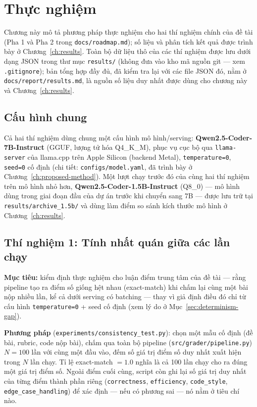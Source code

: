 \documentclass[a4paper,12pt]{report}
\begin{document}
\chapter{Thực nghiệm}
\label{ch:experiments}

Chương này mô tả phương pháp thực nghiệm cho hai thí nghiệm chính của đề
tài (Pha 1 và Pha 2 trong \texttt{docs/roadmap.md}); số liệu và phân tích
kết quả được trình bày ở Chương~\ref{ch:results}. Toàn bộ dữ liệu thô của
các thí nghiệm được lưu dưới dạng JSON trong thư mục \texttt{results/}
(không đưa vào kho mã nguồn git — xem \texttt{.gitignore}); bản tổng hợp
đầy đủ, đã kiểm tra lại với các file JSON đó, nằm ở
\texttt{docs/report/results.md}, là nguồn số liệu duy nhất được dùng cho
chương này và Chương~\ref{ch:results}.

\section{Cấu hình chung}

Cả hai thí nghiệm dùng chung một cấu hình mô hình/serving:
\textbf{Qwen2.5-Coder-7B-Instruct} (GGUF, lượng tử hóa Q4\_K\_M), phục vụ
cục bộ qua \texttt{llama-server} của llama.cpp trên Apple Silicon (backend
Metal), \texttt{temperature=0}, \texttt{seed=0} cố định (chi tiết:
\texttt{configs/model.yaml}, đã trình bày ở
Chương~\ref{ch:proposed-method}). Một lượt chạy trước đó của cùng hai thí
nghiệm trên mô hình nhỏ hơn, \textbf{Qwen2.5-Coder-1.5B-Instruct} (Q8\_0) —
mô hình dùng trong giai đoạn đầu của dự án trước khi chuyển sang 7B — được
lưu trữ tại \texttt{results/archive\_1.5b/} và dùng làm điểm so sánh kích
thước mô hình ở Chương~\ref{ch:results}.

\section{Thí nghiệm 1: Tính nhất quán giữa các lần chạy}
\label{sec:exp-consistency}

\textbf{Mục tiêu:} kiểm định thực nghiệm cho luận điểm trung tâm của đề
tài — rằng pipeline tạo ra điểm số giống hệt nhau (exact-match) khi chấm
lại cùng một bài nộp nhiều lần, kể cả dưới serving có batching — thay vì
giả định điều đó chỉ từ cấu hình \texttt{temperature=0} + seed cố định
(xem lý do ở Mục~\ref{sec:determinism-gap}).

\textbf{Phương pháp} (\texttt{experiments/consistency\_test.py}): chọn một
mẫu cố định (đề bài, rubric, code nộp bài), chấm qua toàn bộ pipeline
(\texttt{src/grader/pipeline.py}) $N=100$ lần với cùng một đầu vào, đếm số
giá trị điểm số duy nhất xuất hiện trong $N$ lần chạy. Tỉ lệ exact-match
$=1.0$ nghĩa là cả 100 lần chạy cho ra đúng một giá trị điểm số. Ngoài điểm
cuối cùng, script còn ghi lại số giá trị duy nhất của từng điểm thành phần
riêng (\texttt{correctness}, \texttt{efficiency}, \texttt{code\_style},
\texttt{edge\_case\_handling}) để xác định — nếu có phương sai — nó nằm ở
tiêu chí nào.
\end{document}
